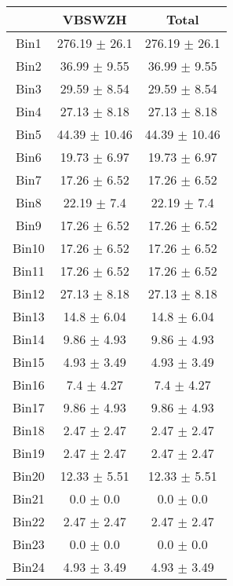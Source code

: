   \begin{tabular}{|c|c|c|}
  \hline
      & VBSWZH & Total \\ \cline{1-3} 
     \hline\hline
     Bin1 & 276.19 $\pm$ 26.1 & 276.19 $\pm$ 26.1 \\ \cline{1-3} 
     Bin2 & 36.99 $\pm$ 9.55 & 36.99 $\pm$ 9.55 \\ \cline{1-3} 
     Bin3 & 29.59 $\pm$ 8.54 & 29.59 $\pm$ 8.54 \\ \cline{1-3} 
     Bin4 & 27.13 $\pm$ 8.18 & 27.13 $\pm$ 8.18 \\ \cline{1-3} 
     Bin5 & 44.39 $\pm$ 10.46 & 44.39 $\pm$ 10.46 \\ \cline{1-3} 
     Bin6 & 19.73 $\pm$ 6.97 & 19.73 $\pm$ 6.97 \\ \cline{1-3} 
     Bin7 & 17.26 $\pm$ 6.52 & 17.26 $\pm$ 6.52 \\ \cline{1-3} 
     Bin8 & 22.19 $\pm$ 7.4 & 22.19 $\pm$ 7.4 \\ \cline{1-3} 
     Bin9 & 17.26 $\pm$ 6.52 & 17.26 $\pm$ 6.52 \\ \cline{1-3} 
     Bin10 & 17.26 $\pm$ 6.52 & 17.26 $\pm$ 6.52 \\ \cline{1-3} 
     Bin11 & 17.26 $\pm$ 6.52 & 17.26 $\pm$ 6.52 \\ \cline{1-3} 
     Bin12 & 27.13 $\pm$ 8.18 & 27.13 $\pm$ 8.18 \\ \cline{1-3} 
     Bin13 & 14.8 $\pm$ 6.04 & 14.8 $\pm$ 6.04 \\ \cline{1-3} 
     Bin14 & 9.86 $\pm$ 4.93 & 9.86 $\pm$ 4.93 \\ \cline{1-3} 
     Bin15 & 4.93 $\pm$ 3.49 & 4.93 $\pm$ 3.49 \\ \cline{1-3} 
     Bin16 & 7.4 $\pm$ 4.27 & 7.4 $\pm$ 4.27 \\ \cline{1-3} 
     Bin17 & 9.86 $\pm$ 4.93 & 9.86 $\pm$ 4.93 \\ \cline{1-3} 
     Bin18 & 2.47 $\pm$ 2.47 & 2.47 $\pm$ 2.47 \\ \cline{1-3} 
     Bin19 & 2.47 $\pm$ 2.47 & 2.47 $\pm$ 2.47 \\ \cline{1-3} 
     Bin20 & 12.33 $\pm$ 5.51 & 12.33 $\pm$ 5.51 \\ \cline{1-3} 
     Bin21 & 0.0 $\pm$ 0.0 & 0.0 $\pm$ 0.0 \\ \cline{1-3} 
     Bin22 & 2.47 $\pm$ 2.47 & 2.47 $\pm$ 2.47 \\ \cline{1-3} 
     Bin23 & 0.0 $\pm$ 0.0 & 0.0 $\pm$ 0.0 \\ \cline{1-3} 
     Bin24 & 4.93 $\pm$ 3.49 & 4.93 $\pm$ 3.49 \\ \cline{1-3} 

\end{tabular}
